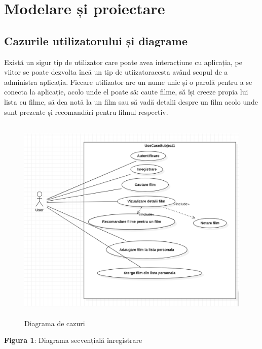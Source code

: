 \chapter{Modelare și proiectare}

\section{Cazurile utilizatorului și diagrame}
\label{sec:ch3sec1}
 \par Există un sigur tip de utilizator care poate avea interacțiune cu aplicația, pe viitor se poate dezvolta încă un tip de utiizatoracesta având scopul de a administra aplicația. Fiecare utilizator are un nume unic și o parolă pentru a se conecta la aplicație, acolo unde el poate să: caute filme, să își creeze propia lui lista cu filme, să dea notă la un film sau să vadă detalii despre un film acolo unde sunt prezente și recomandări pentru filmul respectiv.
		\begin{figure}[htbp]
			\centerline{\includegraphics[width=13cm, height=10cm]{figures/use case.png}}
			\caption{Diagrama de cazuri}
			\label{fig}
		\end{figure}
\newline
\newline
\par \textbf{Figura 1}: Diagrama secvențială înregistrare
